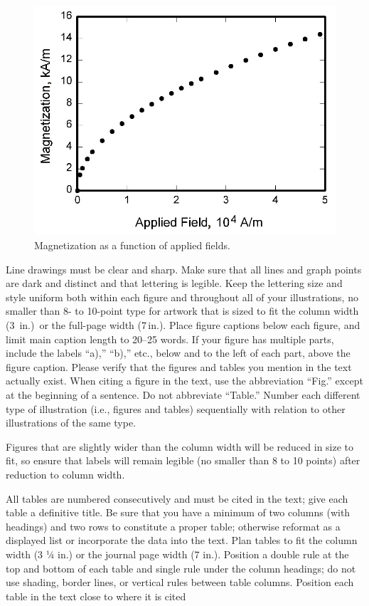 \documentclass[journal ]{new-aiaa}
\begin{document}
\begin{figure}[hbt!]
\centering
\includegraphics[width=.5\textwidth]{graph}
\caption{Magnetization as a function of applied fields.}
\end{figure}

Line drawings must be clear and sharp. Make sure that all lines and graph points are dark and distinct and that lettering is legible. Keep the lettering size and style uniform both within each figure and throughout all of your illustrations, no smaller than 8- to 10-point type for artwork that is sized to fit the column width (3\,\textonequarter{} in.)~or the full-page width (7\,in.). Place figure captions below each figure, and limit main caption length to 20--25 words. If your figure has multiple parts, include the labels “a),” “b),” etc., below and to the left of each part, above the figure caption. Please verify that the figures and tables you mention in the text actually exist. When citing a figure in the text, use the abbreviation “Fig.” except at the beginning of a sentence. Do not abbreviate “Table.” Number each different type of illustration (i.e., figures and tables) sequentially with relation to other illustrations of the same type.

Figures that are slightly wider than the column width will be reduced in size to fit, so ensure that labels will remain legible (no smaller than 8 to 10 points) after reduction to column width. 

All tables are numbered consecutively and must be cited in the text; give each table a definitive title. Be sure that you have a minimum of two columns (with headings) and two rows to constitute a proper table; otherwise reformat as a displayed list or incorporate the data into the text. Plan tables to fit the column width (3 ¼ in.) or the journal page width (7 in.). Position a double rule at the top and bottom of each table and single rule under the column headings; do not use shading, border lines, or vertical rules between table columns. Position each table in the text close to where it is cited
\end{document}
